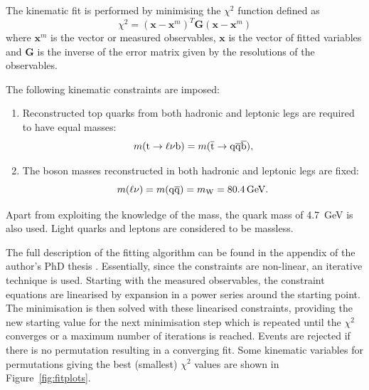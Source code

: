 The kinematic fit is performed by minimising the $\chi^{2}$ function defined as
\begin{equation}
\chi^{2}  = (\mathbf{x} - \mathbf{x}^{m})^{T}\mathbf{G}(\mathbf{x} - \mathbf{x}^{m})
\end{equation}
where $\mathbf{x}^{m}$ is the vector or measured observables, $\mathbf{x}$ is the vector of fitted variables and
$\mathbf{G}$ is the inverse of the error matrix given by the resolutions of the observables.

The following kinematic constraints are imposed:
\begin{enumerate}[topsep=\parskip, parsep=\parskip, itemsep=\parskip, leftmargin=\leftmargin]
	\item Reconstructed top quarks from both hadronic and leptonic legs are required to have equal masses:
	\begin{equation}
		m(\mathrm{t} \to \ell \nu \mathrm{b}) = m(\overline{\mathrm{t}} \to \mathrm{q}\overline{\mathrm{q}} \overline{\mathrm{b}}),
	\end{equation}
	\item The \W boson masses reconstructed in both hadronic and leptonic legs are fixed:
	\begin{equation}
		m(\ell \nu) = m(\cPq\cPaq) = m_{\W} = \SI{80.4}{\GeV}.
	\end{equation}
\end{enumerate}

Apart from exploiting the knowledge of the \W mass, the \cPqb quark mass of \SI{4.7}{\GeV} is also used. Light quarks
and leptons are considered to be massless.

The full description of the fitting algorithm can be found in the appendix of the \HitFit author's PhD thesis
\autocite{Snyder}. Essentially, since the constraints are non-linear, an iterative technique is used. Starting with the
measured observables, the constraint equations are linearised by expansion in a power series around the starting point.
The minimisation is then solved with these linearised constraints, providing the new starting value for the next
minimisation step which is repeated until the $\chi^2$ converges or a maximum number of iterations is reached. Events
are rejected if there is no permutation resulting in a converging fit. Some kinematic variables for permutations giving
the best (smallest) $\chi^2$ values are shown in Figure~\ref{fig:fitplots}.

